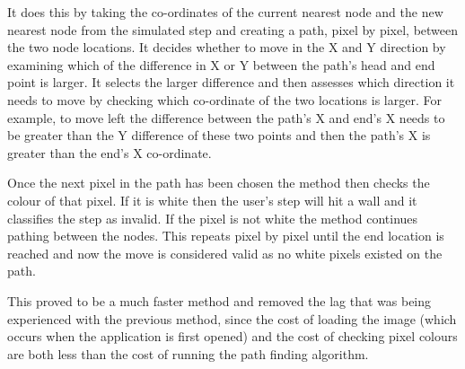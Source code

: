 \documentclass[main.tex]{subfiles}
\begin{document}
It does this by taking the co-ordinates of the current nearest node and the new nearest node from the simulated step and creating a path, pixel by pixel, between the two node locations. It decides whether to move in the X and Y direction by examining which of the difference in X or Y between the path's head and end point is larger. It selects the larger difference and then assesses which direction it needs to move by checking which co-ordinate of the two locations is larger. For example, to move left the difference between the path's X and end's X needs to be greater than the Y difference of these two points and then the path's X is greater than the end's X co-ordinate.

Once the next pixel in the path has been chosen the method then checks the colour of that pixel. If it is white then the user's step will hit a wall and it classifies the step as invalid. If the pixel is not white the method continues pathing between the nodes. This repeats pixel by pixel until the end location is reached and now the move is considered valid as no white pixels existed on the path.

This proved to be a much faster method and removed the lag that was being experienced with the previous method, since the cost of loading the image (which occurs when the application is first opened) and the cost of checking pixel colours are both less than the cost of running the path finding algorithm.
\end{document}
